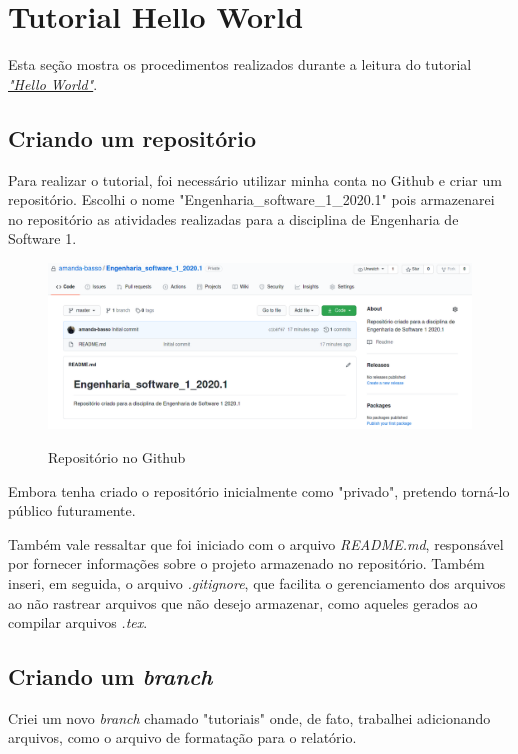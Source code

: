 \section{Tutorial Hello World}
    Esta seção mostra os procedimentos realizados durante a leitura do tutorial \href{https://guides.github.com/activities/hello-world/}{\textit{"Hello World"}}.
    
    \subsection{Criando um repositório}
    Para realizar o tutorial, foi necessário utilizar minha conta no Github e criar um repositório. Escolhi o nome "Engenharia\_software\_1\_2020.1" pois armazenarei no repositório as atividades realizadas para a disciplina de Engenharia de Software 1.
    
    \begin{figure}[H]
        \caption{Repositório no Github}
        \vspace{0.5cm}
        \centering
        \includegraphics[width=15cm]{imagens/criacao_repositorio.png}
        \label{figura:repositorio_github}
    \end{figure}

    Embora tenha criado o repositório inicialmente como "privado", pretendo torná-lo público futuramente.
    \par Também vale ressaltar que foi iniciado com o arquivo \textit{README.md}, responsável por fornecer informações sobre o projeto armazenado no repositório. Também inseri, em seguida, o arquivo \textit{.gitignore}, que facilita o gerenciamento dos arquivos ao não rastrear arquivos que não desejo armazenar, como aqueles gerados ao compilar arquivos \textit{.tex}.
    
    \subsection{Criando um \textit{branch}}
    Criei um novo \textit{branch} chamado "tutoriais" onde, de fato, trabalhei adicionando arquivos, como o arquivo de formatação para o relatório.
    
